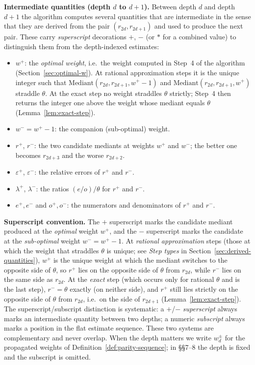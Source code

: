 \documentclass[12pt]{article}
\theoremstyle{definition}
\theoremstyle{remark}
\theoremstyle{plain}
\newcommand{\lam}{\lambda}
\newcommand{\eps}{\varepsilon}
\newcommand{\wplus}{w^{+}}
\newcommand{\wminus}{w^{-}}
\newcommand{\rplus}{r^{+}}
\newcommand{\rminus}{r^{-}}
\newcommand{\eplus}{e^{+}}
\newcommand{\eminus}{e^{-}}
\newcommand{\odenp}{o^{+}}
\newcommand{\odenm}{o^{-}}
\newcommand{\epsplus}{\eps^{+}}
\newcommand{\epsminus}{\eps^{-}}
\newcommand{\lamplus}{\lam^{+}}
\newcommand{\lamminus}{\lam^{-}}
\begin{document}
\textbf{Intermediate quantities (depth $d$ to $d+1$).}
Between depth $d$ and depth $d+1$ the algorithm computes several
quantities that are intermediate in the sense that they are derived from
the pair $(r_{2d}, r_{2d+1})$ and used to produce the next pair.
These carry \emph{superscript} decorations $+$, $-$ (or $*$ for a combined value)
to distinguish them from the depth-indexed estimates:
\begin{itemize}
  \item $\wplus$: the \emph{optimal weight}, i.e.\ the weight computed in Step~4 of the
    algorithm (Section~\ref{sec:optimal-w}).
    At rational approximation steps it is the unique integer such that
    $\mathrm{Mediant}(r_{2d}, r_{2d+1}, \wplus-1)$ and
    $\mathrm{Mediant}(r_{2d}, r_{2d+1}, \wplus)$ straddle $\theta$.
    At the exact step no weight straddles $\theta$ strictly; Step~4 then returns the integer
    one above the weight whose mediant equals $\theta$
    (Lemma~\ref{lem:exact-step}).
  \item $\wminus = \wplus - 1$: the companion (sub-optimal) weight.
  \item $\rplus$, $\rminus$: the two candidate mediants at weights $\wplus$ and $\wminus$;
    the better one becomes $r_{2d+3}$ and the worse $r_{2d+2}$.
  \item $\epsplus$, $\epsminus$: the relative errors of $\rplus$ and $\rminus$.
  \item $\lamplus$, $\lamminus$: the ratios $(e/o)/\theta$ for $\rplus$ and $\rminus$.
  \item $\eplus, \eminus$ and $\odenp, \odenm$: the numerators and denominators
    of $\rplus$ and $\rminus$.
\end{itemize}
\textbf{Superscript convention.}
The $+$ superscript marks the candidate mediant produced at the \emph{optimal}
weight $\wplus$, and the $-$ superscript marks the candidate at the
\emph{sub-optimal} weight $\wminus = \wplus - 1$.
At \emph{rational approximation} steps (those at which the weight that straddles $\theta$ is unique;
see \emph{Step types} in Section~\ref{sec:derived-quantities}), $\wplus$ is the unique weight
at which the mediant switches to the opposite side of $\theta$, so $\rplus$ lies on the
opposite side of $\theta$ from $r_{2d}$, while $\rminus$ lies on the same side as $r_{2d}$.
At the \emph{exact} step (which occurs only for rational $\theta$ and is the last step),
$\rminus = \theta$ exactly (on neither side), and $\rplus$ still lies strictly on the
opposite side of $\theta$ from $r_{2d}$, i.e.\ on the side of $r_{2d+1}$
(Lemma~\ref{lem:exact-step}).
The superscript/subscript distinction is systematic: a $+$/$-$ \emph{superscript}
always marks an intermediate quantity between two depths; a numeric \emph{subscript}
always marks a position in the flat estimate sequence.
These two systems are complementary and never overlap.
When the depth matters we write $w^\pm_d$ for the propagated weights of
Definition~\ref{def:parity-sequence}; in \S\S7--8 the depth is fixed and the subscript is omitted.
\end{document}
